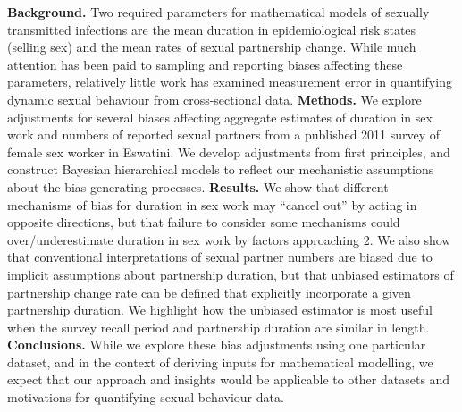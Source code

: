 \textbf{Background.}
Two required parameters for mathematical models of sexually transmitted infections are
the mean duration in epidemiological risk states (\eg selling sex) and
the mean rates of sexual partnership change.
While much attention has been paid to
sampling and reporting biases affecting these parameters,
relatively little work has examined measurement error
in quantifying dynamic sexual behaviour from cross-sectional data.
\textbf{Methods.}
We explore adjustments for several biases affecting aggregate estimates of
duration in sex work and numbers of reported sexual partners
from a published 2011 survey of female sex worker in Eswatini.
We develop adjustments from first principles,
and construct Bayesian hierarchical models to reflect
our mechanistic assumptions about the bias-generating processes.
\textbf{Results.}
We show that different mechanisms of bias for duration in sex work may
``cancel out'' by acting in opposite directions,
but that failure to consider some mechanisms could over/underestimate
duration in sex work by factors approaching 2.
We also show that conventional interpretations of sexual partner numbers
are biased due to implicit assumptions about partnership duration,
but that unbiased estimators of partnership change rate can be defined
that explicitly incorporate a given partnership duration.
We highlight how the unbiased estimator is most useful when
the survey recall period and partnership duration are similar in length.
\textbf{Conclusions.}
While we explore these bias adjustments using one particular dataset,
and in the context of deriving inputs for mathematical modelling,
we expect that our approach and insights would be applicable to
other datasets and motivations for quantifying sexual behaviour data.
